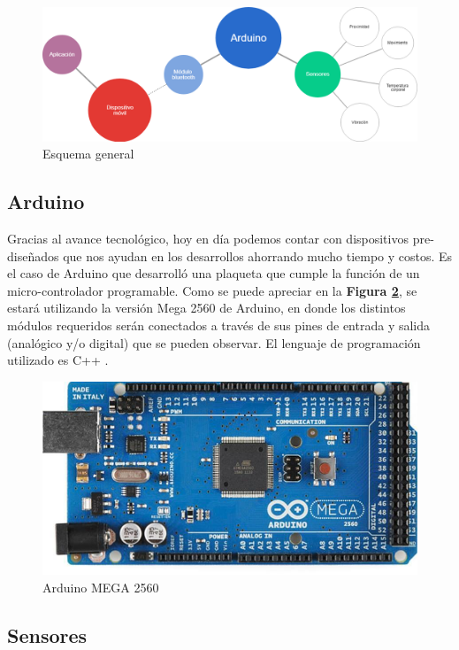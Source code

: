 \documentclass{IEEEtran}
\begin{document}
			\begin{figure}
				\centering
				\includegraphics[width=1\linewidth]{esquemageneral}
				\caption{Esquema general}
				\label{esquemageneral}
			\end{figure}

		\subsection{Arduino}

			Gracias al avance tecnológico, hoy en día podemos contar con dispositivos pre-diseñados que nos ayudan en los desarrollos ahorrando mucho tiempo y costos. Es el caso de Arduino \cite{arduinourl} que desarrolló una plaqueta que cumple la función de un micro-controlador programable.
			Como se puede apreciar en la \textbf{Figura \ref{arduino-mega}}, se estará utilizando la versión Mega 2560 de Arduino, en donde los distintos módulos requeridos serán conectados a través de sus pines de entrada y salida (analógico y/o digital) que se pueden observar. El lenguaje de programación utilizado es C++ \cite{arduinocode}. 

			\begin{figure}
				\centering
				\includegraphics[width=0.8\linewidth]{arduino-mega}
				\caption{Arduino MEGA 2560}
				\label{arduino-mega}
			\end{figure}

		\subsection{Sensores}
\end{document}
